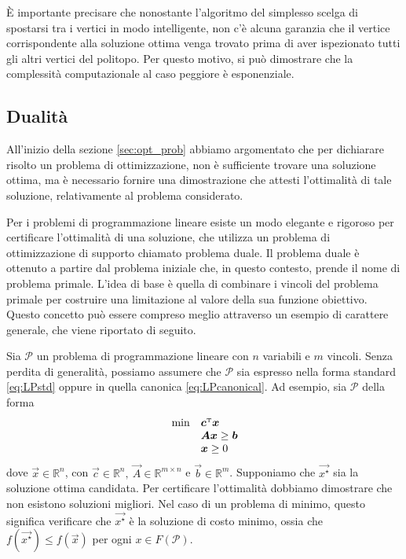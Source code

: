 \`E importante precisare che nonostante l'algoritmo del simplesso scelga di spostarsi tra i vertici in modo
intelligente, non c'è alcuna garanzia che il vertice corrispondente alla soluzione ottima venga trovato prima di aver
ispezionato tutti gli altri vertici del politopo. Per questo motivo, si può dimostrare che la complessità computazionale
al caso peggiore è esponenziale.

\subsection{Dualità}\label{sec:lpduality}
All'inizio della sezione \ref{sec:opt_prob} abbiamo argomentato che per dichiarare risolto un problema di
ottimizzazione, non è sufficiente trovare una soluzione ottima, ma è necessario fornire una dimostrazione
che attesti l'ottimalità di tale soluzione, relativamente al problema considerato.

Per i problemi di programmazione lineare esiste un modo elegante e rigoroso per certificare l'ottimalità di una
soluzione, che utilizza un problema di ottimizzazione di supporto chiamato problema duale. Il problema duale è ottenuto
a partire dal problema iniziale che, in questo contesto, prende il nome di problema primale. L'idea di base è quella di
combinare i vincoli del problema primale per costruire una limitazione al valore della sua funzione obiettivo. Questo
concetto può essere compreso meglio attraverso un esempio di carattere generale, che viene riportato di seguito.

Sia $\mathcal{P}$ un problema di programmazione lineare con $n$ variabili e
$m$ vincoli. Senza perdita di generalità, possiamo assumere che
$\mathcal{P}$ sia espresso nella forma standard \eqref{eq:LPstd} oppure in
quella canonica \eqref{eq:LPcanonical}. Ad esempio, sia $\mathcal{P}$ della
forma
\begin{equation}\label{eq:canonicalduality}
    \begin{array}{ll}
        \,\min & \bm{c}^{\scriptscriptstyle\mathrm{T}} \bm{x} \\
               & \bm{A} \bm{x} \ge \bm{b} \\
             & \bm{x} \ge 0
    \end{array}\\[5pt]
\end{equation}
dove $\vec{x} \in \mathbb{R}^n$, con $\vec{c} \in \mathbb{R}^n,\ \vec{A} \in \mathbb{R}^{m \times n}$ e $\vec{b} \in
\mathbb{R}^m$. Supponiamo che \( \vec{x^{\star}} \) sia la soluzione ottima candidata. Per certificare l'ottimalità
dobbiamo dimostrare che non esistono soluzioni migliori. Nel caso di un problema di minimo, questo significa verificare
che \( \vec{x^{\star}} \) è la soluzione di costo minimo, ossia che \( f(\vec{x^{\star}}) \leq f(\vec{x}) \) per ogni \(
x \in F(\mathcal{P}) \).

